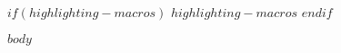 



$if(highlighting-macros)$
$highlighting-macros$
$endif$


\frontmatter
{}




\tableofcontents
\cleardoublepage
\cfoot*{}
\ofoot*{\pagemark}
\mainmatter

$body$

\cfoot*{\pagemark}
\ofoot*{}
\backmatter
{}
\nocite{*}




